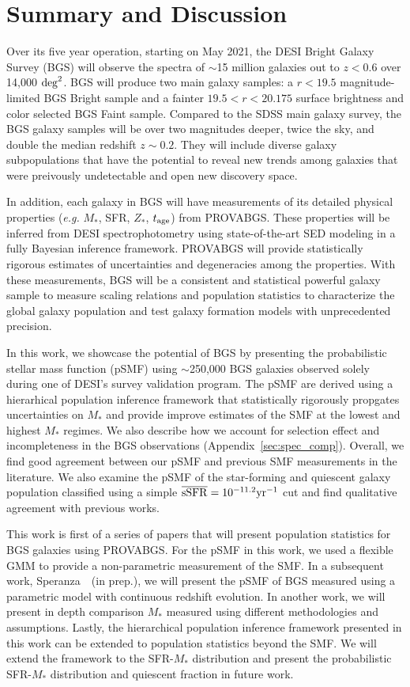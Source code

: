 \section{Summary and Discussion} \label{sec:summary}
Over its five year operation, starting on May 2021, the DESI Bright Galaxy
Survey (BGS) will observe the spectra of $\sim$15 million galaxies out to 
$z < 0.6$ over 14,000 ${\rm deg}^2$.  
BGS will produce two main galaxy samples: a $r < 19.5$ magnitude-limited BGS
Bright sample and a fainter $19.5 < r < 20.175$ surface brightness and color
selected BGS Faint sample. 
Compared to the SDSS main galaxy survey, the BGS galaxy samples will be over
two magnitudes deeper, twice the sky, and double the median redshift
$z\sim0.2$. 
They will include diverse galaxy subpopulations that have the potential to
reveal new trends among galaxies that were preivously undetectable and open new
discovery space. 

In addition, each galaxy in BGS will have measurements of its detailed physical
properties (\emph{e.g.} $M_*$, SFR, $Z_*$, $t_{\rm age}$) from PROVABGS. 
These properties will be inferred from DESI spectrophotometry using
state-of-the-art  SED modeling in a fully Bayesian inference framework. 
PROVABGS will provide statistically rigorous estimates of uncertainties and
degeneracies among the properties.
With these measurements, BGS will be a consistent and statistical powerful
galaxy sample to measure scaling relations and population statistics to
characterize the global galaxy population and test galaxy formation models
with unprecedented precision.

In this work, we showcase the potential of BGS by presenting the probabilistic
stellar mass function (pSMF) using $\sim$250,000 BGS galaxies observed solely
during one of DESI's survey validation program.
The pSMF are derived using a hierarhical population inference framework that 
statistically rigorously propgates uncertainties on $M_*$ and provide improve
estimates of the SMF at the lowest and highest $M_*$ regimes. 
We also describe how we account for selection effect and incompleteness in the
BGS observations (Appendix~\ref{sec:spec_comp}).  
Overall, we find good agreement between our pSMF and previous SMF measurements
in the literature. 
We also examine the pSMF of the star-forming and quiescent galaxy population
classified using a simple $\overline{\rm sSFR} = 10^{-11.2}{\rm yr}^{-1}$ cut
and find qualitative agreement with previous works. 

This work is first of a series of papers that will present population
statistics for BGS galaxies using PROVABGS. 
For the pSMF in this work, we used a flexible GMM to provide a non-parametric
measurement of the SMF.
In a subsequent work, Speranza~\etal~(in prep.), we will present the pSMF of BGS
measured using a parametric model with continuous redshift evolution. 
In another work, we will present in depth comparison $M_*$ measured using
different methodologies and assumptions. 
Lastly, the hierarchical population inference framework presented in this work
can be extended to population statistics beyond the SMF. 
We will extend the framework to the SFR-$M_*$ distribution and present the
probabilistic SFR-$M_*$ distribution and quiescent fraction in future work. 

